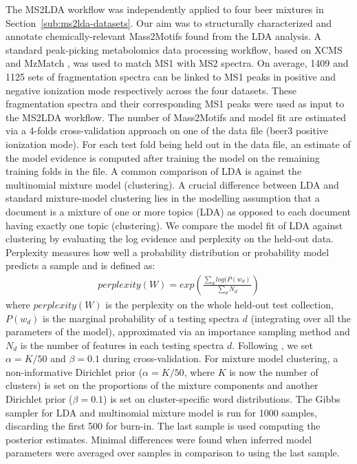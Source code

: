 The MS2LDA workflow was independently applied to four beer mixtures in Section~\ref{sub:ms2lda-datasets}. Our aim was to structurally characterized and annotate chemically-relevant Mass2Motifs found from the LDA analysis. A standard peak-picking metabolomics data processing workflow, based on XCMS \cite{Smith2006} and MzMatch \cite{Scheltema2011}, was used to match MS1 with MS2 spectra. On average, 1409 and 1125 sets of fragmentation spectra can be linked to MS1 peaks in positive and negative ionization mode respectively across the four datasets. These fragmentation spectra and their corresponding MS1 peaks were used as input to the MS2LDA workflow. The number of Mass2Motifs and model fit are estimated via a 4-folds cross-validation approach on one of the data file (beer3 positive ionization mode). For each test fold being held out in the data file, an estimate of the model evidence is computed after training the model on the remaining training folds in the file. A common comparison of LDA is against the multinomial mixture model (clustering). A crucial difference between LDA and standard mixture-model clustering lies in the modelling assumption that a document is a mixture of one or more topics (LDA) as opposed to each document having exactly one topic (clustering). We compare the model fit of LDA against clustering by evaluating the log evidence and perplexity on the held-out data. Perplexity measures how well a probability distribution or probability model predicts a sample and is defined as:
\begin{align*}
perplexity(W)=exp\left(\frac{\sum_{d}log(P(w_{d})}{\sum_{d}N_d}\right)
\end{align*}
where $perplexity(W)$ is the perplexity on the whole held-out test collection, $P(w_d)$ is the marginal probability of a testing spectra $d$ (integrating over all the parameters of the model), approximated via an importance sampling method \cite{wallach2009evaluation} and $N_d$ is the number of features in each testing spectra $d$. Following \cite{Griffiths2004}, we set $\alpha=K/50$ and $\beta=0.1$ during cross-validation. For mixture model clustering, a non-informative Dirichlet prior ($\alpha=K/50$, where $K$ is now the number of clusters) is set on the proportions of the mixture components and another Dirichlet prior ($\beta=0.1$) is set on cluster-specific word distributions. The Gibbs sampler for LDA and multinomial mixture model is run for 1000 samples, discarding the first 500 for burn-in. The last sample is used computing the posterior estimates. Minimal differences were found when inferred model parameters were averaged over samples in comparison to using the last sample.

